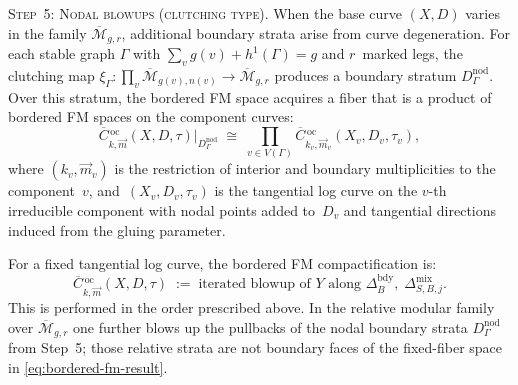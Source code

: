 \begin{construction}
\medskip
\noindent\textsc{Step~5: Nodal blowups (clutching type).}
When the base curve $(X, D)$ varies in the family
$\overline{\mathcal{M}}_{g,r}$, additional boundary strata
arise from curve degeneration. For each stable graph
$\Gamma$ with $\sum_v g(v) + h^1(\Gamma) = g$ and
$r$~marked legs, the clutching map
$\xi_\Gamma \colon \prod_v \overline{\mathcal{M}}_{g(v), n(v)} \to
\overline{\mathcal{M}}_{g,r}$ produces a boundary stratum
$D_\Gamma^{\mathrm{nod}}$. Over this stratum, the bordered FM
space acquires a fiber that is a product of bordered FM spaces on
the component curves:
\begin{equation}\label{eq:nodal-fiber}
\overline{C}{}^{\,\mathrm{oc}}_{k,\vec{m}}(X, D, \tau)
\big|_{D_\Gamma^{\mathrm{nod}}}
\;\cong\;
\prod_{v \in V(\Gamma)}
\overline{C}{}^{\,\mathrm{oc}}_{k_v, \vec{m}_v}
(X_v, D_v, \tau_v),
\end{equation}
where $(k_v, \vec{m}_v)$ is the restriction of interior and
boundary multiplicities to the component~$v$, and~$(X_v, D_v,
\tau_v)$ is the tangential log curve on the $v$-th irreducible
component with nodal points added to~$D_v$ and tangential
directions induced from the gluing parameter.

\medskip
For a fixed tangential log curve, the bordered FM compactification is:
\begin{equation}\label{eq:bordered-fm-result}
\overline{C}{}^{\,\mathrm{oc}}_{k,\vec{m}}(X, D, \tau)
\;:=\;
\text{iterated blowup of } Y
\text{ along }
\Delta_B^{\mathrm{bdy}},\;
\Delta_{S,B,j}^{\mathrm{mix}}.
\end{equation}
This is performed in the order prescribed above. In the relative
modular family over
$\overline{\mathcal M}_{g,r}$ one further blows up the pullbacks of
the nodal boundary strata $D_\Gamma^{\mathrm{nod}}$ from Step~5; those
relative strata are not boundary faces of the fixed-fiber space in
\eqref{eq:bordered-fm-result}.
\end{construction}

